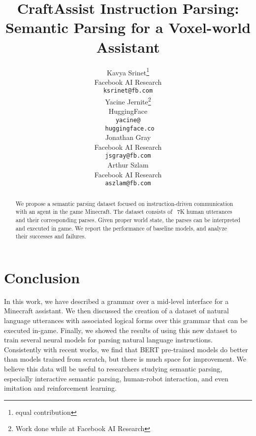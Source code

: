 \documentclass[11pt,a4paper]{article}
\title{CraftAssist Instruction Parsing: Semantic Parsing for a Voxel-world Assistant}
\author{Kavya Srinet\thanks{ equal contribution} \\
  Facebook AI Research  \\
  {\texttt{ksrinet@fb.com} }\\\And
  Yacine Jernite\printfnsymbol{1}\thanks{Work done while at Facebook AI Research} \\
  HuggingFace  \\ 
  {\texttt{yacine@}}\\
  {\texttt{ huggingface.co} }\\\And
  Jonathan Gray \\
  Facebook AI Research  \\
  {\texttt{jsgray@fb.com}} \\\And
  Arthur Szlam \\
  Facebook AI Research  \\
  {\texttt{aszlam@fb.com} }\\}
\date{}
\begin{document}
\maketitle
\begin{abstract}
We propose a semantic parsing dataset focused on instruction-driven communication with an agent in the game Minecraft.  
The dataset consists of 
 ~7K human utterances and their corresponding parses.  Given proper world state, the parses can be interpreted and executed in game. 
We report the performance of baseline models, and analyze their successes and failures.
\end{abstract}








\section{Conclusion}
In this work, we have described a grammar over a mid-level interface for a Minecraft assistant. We then discussed the creation of a dataset of natural language utterances with associated logical forms over this grammar that can be executed in-game. Finally, we showed the results of using this new dataset to train several neural models for parsing natural language instructions.  %
Consistently with recent works, we find that BERT pre-trained models do better than models trained from scratch, but there is much space for improvement.
We believe this data will be useful to researchers studying semantic parsing, especially interactive semantic parsing, human-robot interaction, and even imitation and reinforcement learning.  






\clearpage




\clearpage

\appendix

\label{sec:supplemental}




% 
\end{document}
